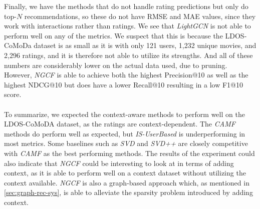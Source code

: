 Finally, we have the methods that do not handle rating predictions but only do top-$N$ recommendations, so these do not have RMSE and MAE values, since they work with interactions rather than ratings.
We see that \textit{LightGCN} is not able to perform well on any of the metrics.
We suspect that this is because the LDOS-CoMoDa dataset is as small as it is with only 121 users, 1,232 unique movies, and 2,296 ratings, and it is therefore not able to utilize its strengths.
And all of these numbers are considerably lower on the actual data used, due to pruning.
However, \textit{NGCF} is able to achieve both the highest Precision@10 as well as the highest NDCG@10 but does have a lower Recall@10 resulting in a low F1@10 score.
\\\\
To summarize, we expected the context-aware methods to perform well on the LDOS-CoMoDA dataset, as the ratings are context-dependent. 
The \textit{CAMF} methods do perform well as expected, but \textit{IS-UserBased} is underperforming in most metrics.
Some baselines such as \textit{SVD} and \textit{SVD++} are closely competitive with \textit{CAMF} as the best performing methods.
The results of the experiment could also indicate that \textit{NGCF} could be interesting to look at in terms of adding context, as it is able to perform well on a context dataset without utilizing the context available. 
\textit{NGCF} is also a graph-based approach which, as mentioned in \autoref{sec:graph-rec-sys}, is able to alleviate the sparsity problem introduced by adding context.

